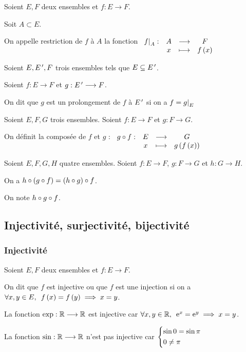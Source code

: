 \begin{defi}
Soient \(E,F\) deux ensembles et \(f:E\to F\).

Soit \(A\subset E\).

On appelle restriction de \(f\) à \(A\) la fonction \(\fonction{\restr{f}{A}}{A}{F}{x}{f\paren{x}}\)
\end{defi}

\begin{defi}
Soient \(E,E^{\,\prime},F\) trois ensembles tels que \(E\subseteq E^{\,\prime}\).

Soient \(f:E\to F\) et \(g:E^{\,\prime}\longrightarrow F\).

On dit que \(g\) est un prolongement de \(f\) à \(E^{\,\prime}\) si on a \(f=\restr{g}{E}\)
\end{defi}

\begin{defi}[Composition]
Soient \(E,F,G\) trois ensembles. Soient \(f:E\to F\) et \(g:F\to G\).

On définit la composée de \(f\) et \(g\) : \(\begin{array}[t]{cccc}g\circ f : & E & \longrightarrow & G \\ & x & \longmapsto & g\left(f\left(x\right)\right)\end{array}\)
\end{defi}

\begin{rem}
Soient \(E,F,G,H\) quatre ensembles. Soient \(f:E\to F\), \(g:F\to G\) et \(h:G\to H\).

On a \(h\circ\left(g\circ f\right)=\left(h\circ g\right)\circ f\).

On note \(h\circ g\circ f\).
\end{rem}

\subsection{Injectivité, surjectivité, bijectivité}

\subsubsection{Injectivité}

\begin{defi}
Soient \(E,F\) deux ensembles et \(f:E\to F\).

On dit que \(f\) est injective ou que \(f\) est une injection si on a \(\quantifs{\forall x,y\in E}f\paren{x}=f\paren{y}\imp x=y\).
\end{defi}

\begin{ex}
La fonction \(\exp:\mathbb{R}\longrightarrow\mathbb{R}\) est injective car \(\quantifs{\forall x,y\in \R}\e{x}=\e{y}\imp x=y\).

La fonction \(\sin:\mathbb{R}\longrightarrow\mathbb{R}\) n'est pas injective car \(\begin{dcases}\sin0=\sin\pi \\ 0\not=\pi\end{dcases}\)
\end{ex}

